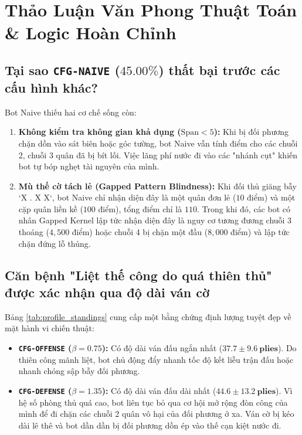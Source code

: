 \documentclass[11pt,a4paper]{article}
\begin{document}
\FloatBarrier
\section{Thảo Luận Văn Phong Thuật Toán \& Logic Hoàn Chỉnh}

\subsection{Tại sao \texorpdfstring{\texttt{CFG-NAIVE} ($45.00\%$)}{CFG-NAIVE (45.00\%)} thất bại trước các cấu hình khác?}
Bot Naive thiếu hai cơ chế sống còn:
\begin{enumerate}
    \item \textbf{Không kiểm tra không gian khả dụng ($\text{Span} < 5$):} Khi bị đối phương chặn dồn vào sát biên hoặc góc tường, bot Naive vẫn tính điểm cho các chuỗi 2, chuỗi 3 quân đã bị bít lối. Việc lãng phí nước đi vào các "nhánh cụt" khiến bot tự bóp nghẹt tài nguyên của mình.
    \item \textbf{Mù thế cờ tách lẻ (Gapped Pattern Blindness):} Khi đối thủ giăng bẫy `X . X X`, bot Naive chỉ nhận diện đây là một quân đơn lẻ ($10$ điểm) và một cặp quân liền kề ($100$ điểm), tổng điểm chỉ là $110$. Trong khi đó, các bot có nhân Gapped Kernel lập tức nhận diện đây là nguy cơ tương đương chuỗi 3 thoáng ($4{,}500$ điểm) hoặc chuỗi 4 bị chặn một đầu ($8{,}000$ điểm) và lập tức chặn đứng lỗ thủng.
\end{enumerate}

\subsection{Căn bệnh "Liệt thế công do quá thiên thủ" được xác nhận qua độ dài ván cờ}
Bảng \ref{tab:profile_standings} cung cấp một bằng chứng định lượng tuyệt đẹp về mặt hành vi chiến thuật:
\begin{itemize}
    \item \textbf{\texttt{CFG-OFFENSE} ($\beta = 0.75$):} Có độ dài ván đấu ngắn nhất ($\mathbf{37.7 \pm 9.6\ \text{plies}}$). Do thiên công mãnh liệt, bot chủ động đẩy nhanh tốc độ kết liễu trận đấu hoặc nhanh chóng sập bẫy đối phương.
    \item \textbf{\texttt{CFG-DEFENSE} ($\beta = 1.35$):} Có độ dài ván đấu dài nhất ($\mathbf{44.6 \pm 13.2\ \text{plies}}$). Vì hệ số phòng thủ quá cao, bot liên tục bỏ qua cơ hội mở rộng đòn công của mình để đi chặn các chuỗi 2 quân vô hại của đối phương ở xa. Ván cờ bị kéo dài lê thê và bot dần dần bị đối phương dồn ép vào thế cạn kiệt nước đi.
\end{itemize}
\end{document}
